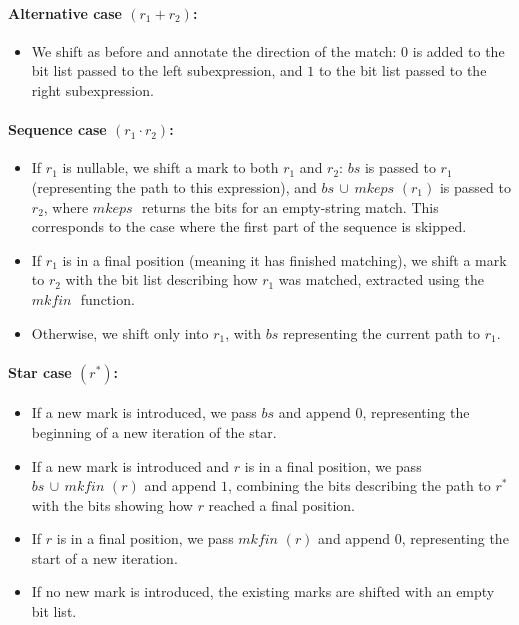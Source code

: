 \documentclass[12pt]{article}
\newcommand{\mkeps}{\textit{mkeps }}
\newcommand{\mkfin}{\textit{mkfin }}
\begin{document}
\paragraph*{\textbf{Alternative case} $(r_1 + r_2)$:}

\begin{itemize}
  \item We shift as before and annotate the direction of the match: 
  $0$ is added to the bit list passed to the left subexpression, 
  and $1$ to the bit list passed to the right subexpression.
\end{itemize}

\paragraph*{\textbf{Sequence case} $(r_1 \cdot r_2)$:}
\begin{itemize}
    \item If $r_1$ is nullable, we shift a mark to both $r_1$ and $r_2$: 
    $bs$ is passed to $r_1$ (representing the path to this expression), 
    and $bs \, \cup \, \mkeps(r_1)$ is passed to $r_2$, where $\mkeps$ returns the bits for an empty-string match. 
    This corresponds to the case where the first part of the sequence is skipped.
    \item If $r_1$ is in a final position (meaning it has finished matching), 
    we shift a mark to $r_2$ with the bit list describing how $r_1$ was matched, 
    extracted using the $\mkfin$ function.
    \item Otherwise, we shift only into $r_1$, with $bs$ representing the current path to $r_1$.
\end{itemize}

\paragraph*{\textbf{Star case} $(r^*)$:}
\begin{itemize}
    \item If a new mark is introduced, we pass $bs$ and append $0$, 
    representing the beginning of a new iteration of the star.
    \item If a new mark is introduced and $r$ is in a final position, 
    we pass $bs \, \cup \, \mkfin(r)$ and append $1$, combining the bits describing the path to $r^*$ 
    with the bits showing how $r$ reached a final position.
    \item If $r$ is in a final position, we pass $\mkfin(r)$ and append $0$, 
    representing the start of a new iteration.
    \item If no new mark is introduced, the existing marks are shifted with an empty bit list.
\end{itemize}
\end{document}
